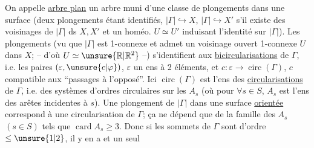 On appelle \uline{arbre plan} un arbre muni d'une classe de plongements dans une surface (deux plongements étant identifiés, $|\Gamma|\hookrightarrow X$, $|\Gamma|\hookrightarrow X'$ s'il existe des voisinages de $|\Gamma|$ ds $X,X'$ et un homéo. $U\simeq U'$ induisant l'identité sur $|\Gamma|$). Les  plongements (vu que $|\Gamma|$ est 1-connexe et admet un voisinage ouvert 1-connexe $U$ dans $X$; -- d'où $U\simeq\unsure{\mathbb R|\mathbb R^2}$ --) s'identifient aux \uline{bicircularisations} de $\Gamma$, i.e. les  paires $(\varepsilon,\unsure{c|\varphi})$, $\varepsilon$ un ens à 2 éléments,  et $c:\varepsilon\longrightarrow\operatorname{circ}(\Gamma)$, $c$ compatible aux ``passages à l'opposé''. Ici $\operatorname{circ}(\Gamma)$ est l'ens des \uline{circularisations} de $\Gamma$, i.e. des systèmes d'ordres circulaires sur les $A_s$ (où pour $\forall s\in S$, $A_s$ est l'ens des arêtes incidentes à $s$). Une  plongement de $|\Gamma|$ dans une surface \uline{orientée} correspond à une circularisation de $\Gamma$; ça ne dépend que de la famille des $A_s$ $(s\in S)$ tels que $\operatorname{card}A_s\geq3$. Donc si les sommets de $\Gamma$ sont d'ordre $\leq\unsure{1|2}$, il y en a  et un seul

